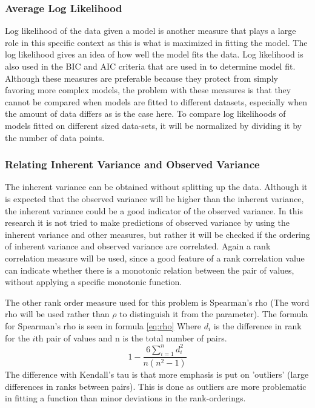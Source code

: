 \documentclass{scrartcl}
\begin{document}
\subsubsection{Average Log Likelihood}
Log likelihood of the data given a model is another measure that plays a large role in this specific context as this is what is maximized in fitting the model. The log likelihood gives an idea of how well the model fits the data. Log likelihood is also used in the BIC and AIC criteria that are used in \cite{lfa} to determine model fit. Although these measures are preferable because they protect from simply favoring more complex models, the problem with these measures is that they cannot be compared when models are fitted to different datasets, especially when the amount of data differs as is the case here.  To compare log likelihoods of models fitted on different sized data-sets, it will be normalized by dividing it by the number of data points.

\subsubsection{Relating Inherent Variance and Observed Variance}
The inherent variance can be obtained without splitting up the data. Although it is expected that the observed variance will be higher than the inherent variance, the inherent variance could be a good indicator of the observed variance. In this research it is not tried to make predictions of observed variance by using the inherent variance and other measures, but rather it will be checked if the ordering of inherent variance and observed variance are correlated. Again a rank correlation measure will be used, since a good feature of a rank correlation value can indicate whether there is a monotonic relation between the pair of values, without applying a specific monotonic function. 
 
The other rank order measure used for this problem is Spearman's rho (The word rho will be used rather than $\rho$ to distinguish it from the parameter). The formula for Spearman's rho is seen in formula \ref{eq:rho} Where $d_{i}$ is the difference in rank for the $i$th pair of values and n is the total number of pairs.
\begin{equation}
\label{eq:rho}
1-\frac{6 \sum\limits_{i=1}^n d_{i}^{2}}{n(n^{2}-1)} 
\end{equation}
The difference with Kendall's tau is that more emphasis is put on 'outliers' (large differences in ranks between pairs). This is done as outliers are more problematic in fitting a function than minor deviations in the rank-orderings.
\end{document}
